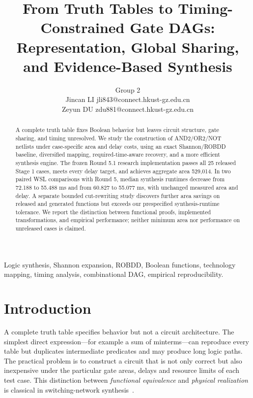 \documentclass[journal,10pt]{IEEEtran}
\begin{document}
\title{From Truth Tables to Timing-Constrained Gate DAGs:\\Representation, Global Sharing, and Evidence-Based Synthesis}
\author{Group 2 \\ Jincan LI jli843@connect.hkust-gz.edu.cn \\ Zeyun DU zdu881@connect.hkust-gz.edu.cn}
\maketitle
\begin{abstract}
A complete truth table fixes Boolean behavior but leaves circuit structure, gate sharing, and timing unresolved. We study the construction of AND2/OR2/NOT netlists under case-specific area and delay costs, using an exact Shannon/ROBDD baseline, diversified mapping, required-time-aware recovery, and a more efficient synthesis engine. The frozen Round 5.1 research implementation passes all 25 released Stage 1 cases, meets every delay target, and achieves aggregate area 529,014. In two paired WSL comparisons with Round 5, median synthesis runtimes decrease from 72.188 to 55.488 ms and from 60.827 to 55.077 ms, with unchanged measured area and delay. A separate bounded cut-rewriting study discovers further area savings on released and generated functions but exceeds our prespecified synthesis-runtime tolerance. We report the distinction between functional proofs, implemented transformations, and empirical performance; neither minimum area nor performance on unreleased cases is claimed.
\end{abstract}
\begin{IEEEkeywords}
Logic synthesis, Shannon expansion, ROBDD, Boolean functions, technology mapping, timing analysis, combinational DAG, empirical reproducibility.
\end{IEEEkeywords}

\section{Introduction}
A complete truth table specifies behavior but not a circuit architecture. The simplest direct expression---for example a sum of minterms---can reproduce every table but duplicates intermediate predicates and may produce long logic paths. The practical problem is to construct a circuit that is not only correct but also inexpensive under the particular gate areas, delays and resource limits of each test case. This distinction between \emph{functional equivalence} and \emph{physical realization} is classical in switching-network synthesis~\cite{shannon1949,brayton1984}.
\end{document}
